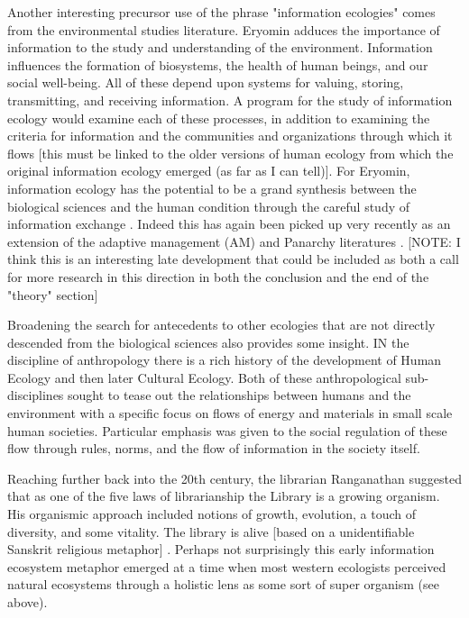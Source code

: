 Another interesting precursor use of the phrase "information ecologies" comes from the environmental studies literature. Eryomin adduces the importance of information to the study and understanding of the environment. Information influences the formation of biosystems, the health of human beings, and our social well-being. All of these depend upon systems for valuing, storing, transmitting, and receiving information. A program for the study of information ecology would examine each of these processes, in addition to examining the criteria for information and the communities and organizations through which it flows [this must be linked to the older versions of human ecology from which the original information ecology emerged (as far as I can tell)]. For Eryomin, information ecology has the potential to be a grand synthesis between the biological sciences and the human condition through the careful study of information exchange \cite{eryomin_information_1998}. Indeed this has again been picked up very recently as an extension of the adaptive management (AM) and Panarchy literatures \cite{eddy_information_2014}. [NOTE: I think this is an interesting late development that could be included as both a call for more research in this direction in both the conclusion and the end of the "theory" section]

Broadening the search for antecedents to other ecologies that are not directly descended from the biological sciences also provides some insight. IN the discipline of anthropology there is a rich history of the development of Human Ecology and then later Cultural Ecology. Both of these anthropological sub-disciplines sought to tease out the relationships between humans and the environment with a specific focus on flows of energy and materials in small scale human societies. Particular emphasis was given to the social regulation of these flow through rules, norms, and the flow of information in the society itself. 
 
Reaching further back into the 20th century, the librarian Ranganathan suggested that as one of the five laws of librarianship the Library is a growing organism. His organismic approach included notions of growth, evolution, a touch of diversity, and some vitality. The library is alive [based on a unidentifiable Sanskrit religious metaphor] \cite{ranganathan_1931}. Perhaps not surprisingly this early information ecosystem metaphor emerged at a time when most western ecologists perceived natural ecosystems through a holistic lens as some sort of super organism (see above).
